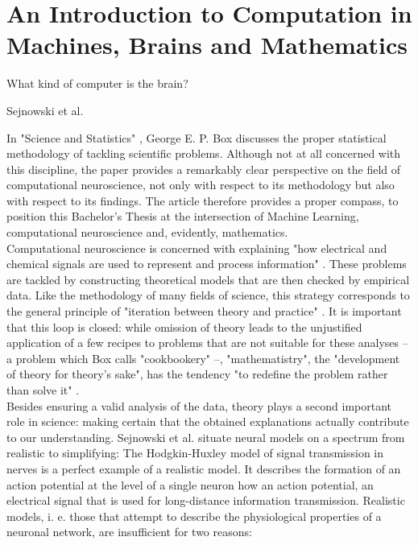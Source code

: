 \documentclass[a4paper,11pt]{report}
\begin{document}
\chapter{An Introduction to Computation in Machines, Brains and Mathematics}
\setcounter{page}{1}

\epigraph{What kind of computer is the brain?}{Sejnowski et al. \cite[][1300]{Sejnowski1988}}

In "Science and Statistics" \cite{Box1976}, George E. P. Box discusses the proper statistical methodology of tackling scientific problems. Although not at all concerned with this discipline, the paper provides a remarkably clear perspective on the field of computational neuroscience, not only with respect to its methodology but also with respect to its findings. The article therefore provides a proper compass, to position this Bachelor's Thesis at the intersection of Machine Learning, computational neuroscience and, evidently, mathematics.\\
Computational neuroscience is concerned with explaining "how electrical and chemical signals are used to represent and process information" \cite[][1299]{Sejnowski1988}. These problems are tackled by constructing theoretical models that are then checked by empirical data. Like the methodology of many fields of science, this strategy corresponds to the general principle of "iteration between theory and practice" \cite[][791]{Box1976}. It is important that this loop is closed: while omission of theory leads to the unjustified application of a few recipes to problems that are not suitable for these analyses -- a problem which Box calls "cookbookery" \cite[][797]{Box1976} --, "mathematistry", the "development of theory for theory's sake", has the tendency "to redefine the problem rather than solve it" \cite[][797]{Box1976}.\\
Besides ensuring a valid analysis of the data, theory plays a second important role in science: making certain that the obtained explanations actually contribute to our understanding. Sejnowski et al. \cite{Sejnowski1988} situate neural models on a spectrum from realistic to simplifying:
The Hodgkin-Huxley model of signal transmission \cite{Hodgkin1952} in nerves is a perfect example of a realistic model. It describes the formation of an action potential at the level of a single neuron how an action potential, an electrical signal that is used for long-distance information transmission. Realistic models, i. e. those that attempt to describe the physiological properties of a neuronal network, are insufficient for two reasons:\\
\end{document}
